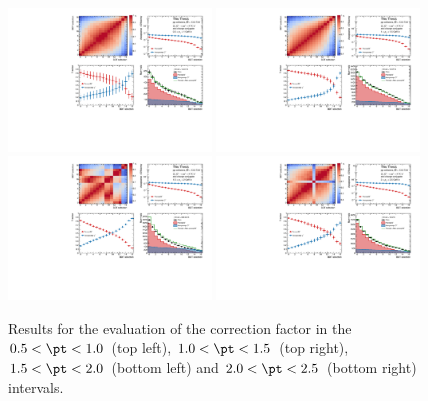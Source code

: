 \begin{figure}
    \centering
    \includegraphics[width=0.48\textwidth]{Figures/Chapter 6/AllPropmtFracs/Dplus/DplusPromptFrac5_10.pdf}
    \includegraphics[width=0.48\textwidth]{Figures/Chapter 6/AllPropmtFracs/Dplus/DplusPromptFrac10_15.pdf}
    \includegraphics[width=0.48\textwidth]{Figures/Chapter 6/AllPropmtFracs/Dplus/DplusPromptFrac15_20.pdf}
    \includegraphics[width=0.48\textwidth]{Figures/Chapter 6/AllPropmtFracs/Dplus/DplusPromptFrac20_25.pdf}
    \caption{Results for the evaluation of the \fpdpl correction factor in the $0.5 < \pt < 1.0$~\gevc (top left), $1.0 < \pt < 1.5$~\gevc (top right), $1.5 < \pt < 2.0$~\gevc (bottom left) and $2.0 < \pt < 2.5$~\gevc (bottom right) intervals.}
\end{figure}


